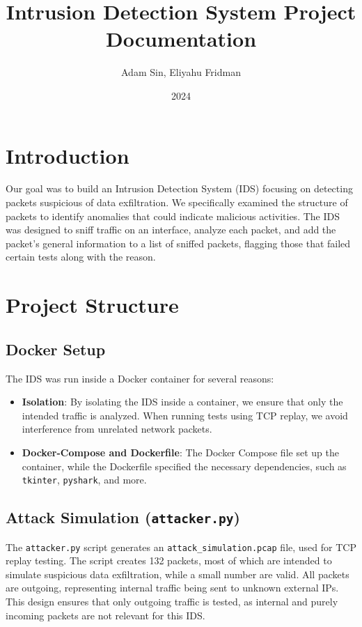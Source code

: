 \documentclass{article}
\title{Intrusion Detection System Project Documentation}
\author{Adam Sin, Eliyahu Fridman}
\date{2024}
\begin{document}
\maketitle

\tableofcontents

\section{Introduction}
Our goal was to build an Intrusion Detection System (IDS) focusing on detecting packets suspicious of data exfiltration. We specifically examined the structure of packets to identify anomalies that could indicate malicious activities. The IDS was designed to sniff traffic on an interface, analyze each packet, and add the packet's general information to a list of sniffed packets, flagging those that failed certain tests along with the reason.

\section{Project Structure}

\subsection{Docker Setup}
The IDS was run inside a Docker container for several reasons:
\begin{itemize}
    \item \textbf{Isolation}: By isolating the IDS inside a container, we ensure that only the intended traffic is analyzed. When running tests using TCP replay, we avoid interference from unrelated network packets.
    \item \textbf{Docker-Compose and Dockerfile}: The Docker Compose file set up the container, while the Dockerfile specified the necessary dependencies, such as \texttt{tkinter}, \texttt{pyshark}, and more.
\end{itemize}

\subsection{Attack Simulation (\texttt{attacker.py})}
The \texttt{attacker.py} script generates an \texttt{attack\_simulation.pcap} file, used for TCP replay testing. The script creates 132 packets, most of which are intended to simulate suspicious data exfiltration, while a small number are valid. All packets are outgoing, representing internal traffic being sent to unknown external IPs. This design ensures that only outgoing traffic is tested, as internal and purely incoming packets are not relevant for this IDS.
\end{document}
